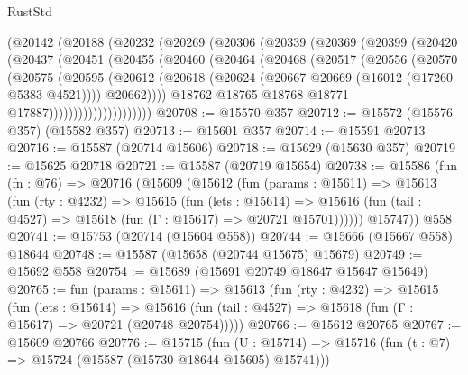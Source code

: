 \begin{lexlean}{RustStd}
\begin{coremodule}
          (@20142
            (@20188
              (@20232
                (@20269
                  (@20306
                    (@20339
                      (@20369
                        (@20399
                          (@20420
                            (@20437
                              (@20451
                                (@20455
                                  (@20460
                                    (@20464
                                      (@20468
                                        (@20517
                                          (@20556
                                            (@20570
                                              (@20575
                                                (@20595
                                                  (@20612
                                                    (@20618
                                                      (@20624
                                                        (@20667
                                                          @20669
                                                          (@16012 (@17260 @5383 @4521))))
                                                      @20662))))
                                              @18762
                                              @18765
                                              @18768
                                              @18771
                                              @17887)))))))))))))))))))))
@20708 := @15570 @357
@20712 := @15572 (@15576 @357) (@15582 @357)
@20713 := @15601 @357
@20714 := @15591 @20713
@20716 := @15587 (@20714 @15606)
@20718 := @15629 (@15630 @357)
@20719 := @15625 @20718
@20721 := @15587 (@20719 @15654)
@20738 := @15586
    (fun (fn : @76) =>
    @20716
      (@15609
        (@15612
          (fun (params : @15611) =>
          @15613
            (fun (rty : @4232) =>
            @15615
              (fun (lets : @15614) =>
              @15616 (fun (tail : @4527) => @15618 (fun (Γ : @15617) => @20721 @15701))))))
        @15747))
    @558
@20741 := @15753 (@20714 (@15604 @558))
@20744 := @15666 (@15667 @558) @18644
@20748 := @15587 (@15658 (@20744 @15675) @15679)
@20749 := @15692 @558
@20754 := @15689 (@15691 @20749 @18647 @15647 @15649)
@20765 := fun (params : @15611) =>
  @15613
    (fun (rty : @4232) =>
    @15615
      (fun (lets : @15614) =>
      @15616 (fun (tail : @4527) => @15618 (fun (Γ : @15617) => @20721 (@20748 @20754)))))
@20766 := @15612 @20765
@20767 := @15609 @20766
@20776 := @15715
    (fun (U : @15714) => @15716 (fun (t : @7) => @15724 (@15587 (@15730 @18644 @15605) @15741)))

\end{coremodule}
\end{lexlean}
